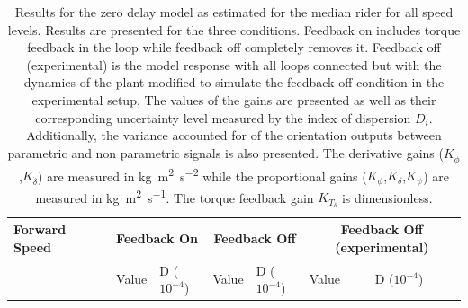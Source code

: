 \begin{table}[]
    \caption{ Results for the zero delay model as estimated for the median rider for all speed levels. Results are presented for the three conditions. Feedback on includes torque feedback in the loop while feedback off completely removes it. Feedback off (experimental) is the model response with all loops connected but with the dynamics of the plant modified to simulate the feedback off condition in the experimental setup. The values of the gains are presented as well as their corresponding uncertainty level measured by the index of dispersion \ensuremath{D_i}. Additionally, the variance accounted for of the orientation outputs between parametric and non parametric signals is also presented. The derivative gains (\ensuremath{K_{\dot{\phi}}},\ensuremath{K_{\dot{\delta}}}) are measured in \si{\kilogram\square\meter\per\square\second} while the proportional gains (\ensuremath{K_{\phi}},\ensuremath{K_{\delta}},\ensuremath{K_{\psi}}) are measured in \si{\kilogram\square\meter\per\second}. The torque feedback gain \ensuremath{K_{T_\delta}} is dimensionless.}
    \begin{tabular}{llcccccc}
    \hline
    Forward Speed                &                       & \multicolumn{2}{l}{Feedback On}                                                                 & \multicolumn{2}{c}{Feedback Off}                                                                & \multicolumn{2}{c}{Feedback Off (experimental)}                                                 \\ \hline
                                 &                       & \multicolumn{1}{l}{\multirow{2}{*}{Value}} & \multicolumn{1}{l}{\multirow{2}{*}{D ($10^{-4}$)}} & \multicolumn{1}{l}{\multirow{2}{*}{Value}} & \multicolumn{1}{l}{\multirow{2}{*}{D ($10^{-4}$)}} & \multicolumn{1}{l}{\multirow{2}{*}{Value}} & \multicolumn{1}{l}{\multirow{2}{*}{D ($10^{-4}$)}} \\
                                 &                       & \multicolumn{1}{l}{}                       & \multicolumn{1}{l}{}                               & \multicolumn{1}{l}{}                       & \multicolumn{1}{l}{}                               & \multicolumn{1}{l}{}                       & \multicolumn{1}{l}{}                               \\ \cline{3-8} 

\end{tabular}
\end{table}
